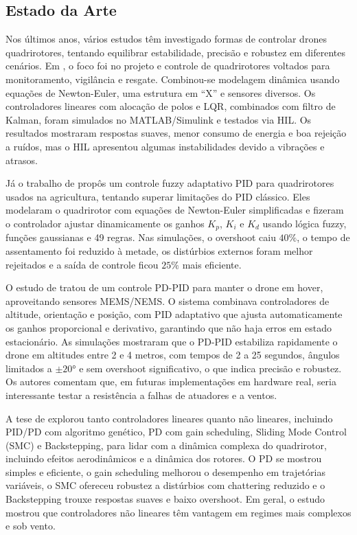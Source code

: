 \subsection{Estado da Arte}
Nos últimos anos, vários estudos têm investigado formas de controlar drones quadrirotores, tentando equilibrar estabilidade, precisão e robustez em diferentes cenários. Em \cite{pfeifer}, o foco foi no projeto e controle de quadrirotores voltados para monitoramento, vigilância e resgate. Combinou-se modelagem dinâmica usando equações de Newton-Euler, uma estrutura em ``X'' e sensores diversos. Os controladores lineares com alocação de polos e LQR, combinados com filtro de Kalman, foram simulados no MATLAB/Simulink e testados via HIL. Os resultados mostraram respostas suaves, menor consumo de energia e boa rejeição a ruídos, mas o HIL apresentou algumas instabilidades devido a vibrações e atrasos.

Já o trabalho de \cite{he} propôs um controle fuzzy adaptativo PID para quadrirotores usados na agricultura, tentando superar limitações do PID clássico. Eles modelaram o quadrirotor com equações de Newton-Euler simplificadas e fizeram o controlador ajustar dinamicamente os ganhos $K_p$, $K_i$ e $K_d$ usando lógica fuzzy, funções gaussianas e 49 regras. Nas simulações, o overshoot caiu $40\%$, o tempo de assentamento foi reduzido à metade, os distúrbios externos foram melhor rejeitados e a saída de controle ficou $25\%$ mais eficiente.

O estudo de \cite{1} tratou de um controle PD-PID para manter o drone em hover, aproveitando sensores MEMS/NEMS. O sistema combinava controladores de altitude, orientação e posição, com PID adaptativo que ajusta automaticamente os ganhos proporcional e derivativo, garantindo que não haja erros em estado estacionário. As simulações mostraram que o PD-PID estabiliza rapidamente o drone em altitudes entre 2 e 4 metros, com tempos de 2 a 25 segundos, ângulos limitados a $\pm20°$ e sem overshoot significativo, o que indica precisão e robustez. Os autores comentam que, em futuras implementações em hardware real, seria interessante testar a resistência a falhas de atuadores e a ventos.

A tese de \cite{elkholy} explorou tanto controladores lineares quanto não lineares, incluindo PID/PD com algoritmo genético, PD com gain scheduling, Sliding Mode Control (SMC) e Backstepping, para lidar com a dinâmica complexa do quadrirotor, incluindo efeitos aerodinâmicos e a dinâmica dos rotores. O PD se mostrou simples e eficiente, o gain scheduling melhorou o desempenho em trajetórias variáveis, o SMC ofereceu robustez a distúrbios com chattering reduzido e o Backstepping trouxe respostas suaves e baixo overshoot. Em geral, o estudo mostrou que controladores não lineares têm vantagem em regimes mais complexos e sob vento.

